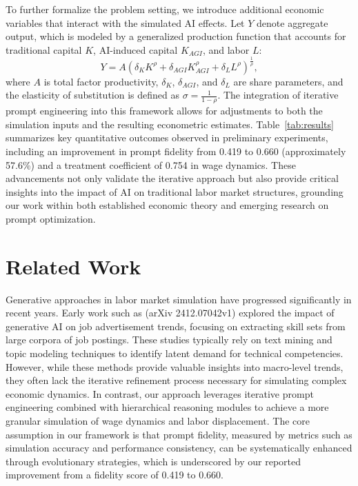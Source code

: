 \documentclass{article}
\begin{document}
To further formalize the problem setting, we introduce additional economic variables that interact with the simulated AI effects. Let \(Y\) denote aggregate output, which is modeled by a generalized production function that accounts for traditional capital \(K\), AI-induced capital \(K_{AGI}\), and labor \(L\):
\[
Y = A \left( \delta_K K^\rho + \delta_{AGI} K_{AGI}^\rho + \delta_L L^\rho \right)^{\frac{1}{\rho}},
\]
where \(A\) is total factor productivity, \(\delta_K\), \(\delta_{AGI}\), and \(\delta_L\) are share parameters, and the elasticity of substitution is defined as \(\sigma = \frac{1}{1-\rho}\). The integration of iterative prompt engineering into this framework allows for adjustments to both the simulation inputs and the resulting econometric estimates. Table~\ref{tab:results} summarizes key quantitative outcomes observed in preliminary experiments, including an improvement in prompt fidelity from 0.419 to 0.660 (approximately 57.6\%) and a treatment coefficient of 0.754 in wage dynamics. These advancements not only validate the iterative approach but also provide critical insights into the impact of AI on traditional labor market structures, grounding our work within both established economic theory and emerging research on prompt optimization.

\section{Related Work}
Generative approaches in labor market simulation have progressed significantly in recent years. Early work such as (arXiv 2412.07042v1) explored the impact of generative AI on job advertisement trends, focusing on extracting skill sets from large corpora of job postings. These studies typically rely on text mining and topic modeling techniques to identify latent demand for technical competencies. However, while these methods provide valuable insights into macro-level trends, they often lack the iterative refinement process necessary for simulating complex economic dynamics. In contrast, our approach leverages iterative prompt engineering combined with hierarchical reasoning modules to achieve a more granular simulation of wage dynamics and labor displacement. The core assumption in our framework is that prompt fidelity, measured by metrics such as simulation accuracy and performance consistency, can be systematically enhanced through evolutionary strategies, which is underscored by our reported improvement from a fidelity score of 0.419 to 0.660.
\end{document}
